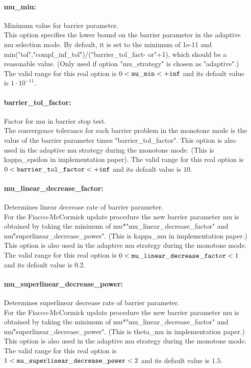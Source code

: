 \paragraph{mu\_min:}\label{sec:mu_min} Minimum value for barrier parameter. $\;$ \\
 This option specifies the lower bound on the
barrier parameter in the adaptive mu selection
mode. By default, it is set to the minimum of
1e-11 and
min("tol","compl\_inf\_tol")/("barrier\_tol\_fact-
or"+1), which should be a reasonable value. (Only
used if option "mu\_strategy" is chosen as
"adaptive".) The valid range for this real option is 
$0 <  {\tt mu\_min } <  {\tt +inf}$
and its default value is $1 \cdot 10^{-11}$.


\paragraph{barrier\_tol\_factor:}\label{sec:barrier_tol_factor} Factor for mu in barrier stop test. $\;$ \\
 The convergence tolerance for each barrier
problem in the monotone mode is the value of the
barrier parameter times "barrier\_tol\_factor".
This option is also used in the adaptive mu
strategy during the monotone mode. (This is
kappa\_epsilon in implementation paper). The valid range for this real option is 
$0 <  {\tt barrier\_tol\_factor } <  {\tt +inf}$
and its default value is $10$.


\paragraph{mu\_linear\_decrease\_factor:}\label{sec:mu_linear_decrease_factor} Determines linear decrease rate of barrier parameter. $\;$ \\
 For the Fiacco-McCormick update procedure the new
barrier parameter mu is obtained by taking the
minimum of mu*"mu\_linear\_decrease\_factor" and
mu\^"superlinear\_decrease\_power".  (This is
kappa\_mu in implementation paper.) This option
is also used in the adaptive mu strategy during
the monotone mode. The valid range for this real option is 
$0 <  {\tt mu\_linear\_decrease\_factor } <  1$
and its default value is $0.2$.


\paragraph{mu\_superlinear\_decrease\_power:}\label{sec:mu_superlinear_decrease_power} Determines superlinear decrease rate of barrier parameter. $\;$ \\
 For the Fiacco-McCormick update procedure the new
barrier parameter mu is obtained by taking the
minimum of mu*"mu\_linear\_decrease\_factor" and
mu\^"superlinear\_decrease\_power".  (This is
theta\_mu in implementation paper.) This option
is also used in the adaptive mu strategy during
the monotone mode. The valid range for this real option is 
$1 <  {\tt mu\_superlinear\_decrease\_power } <  2$
and its default value is $1.5$.


